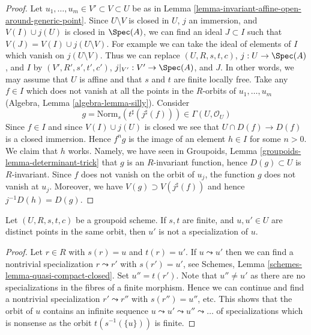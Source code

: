 \begin{proof}
Let $u_1, \ldots, u_m \in V' \subset V \subset U$ be as in
Lemma \ref{lemma-invariant-affine-open-around-generic-point}.
Since $U \setminus V$ is closed in $U$, $j$ an immersion, and $V(I) \cup j(U)$
is closed in $\Spec(A)$, we can find an ideal
$J \subset I$ such that $V(J) = V(I) \cup j(U \setminus V)$.
For example we can take the ideal of elements of $I$ which
vanish on $j(U \setminus V)$. Thus we can replace
$(U, R, s, t, c)$, $j : U \to \Spec(A)$, and $I$ by
$(V', R', s', t', c')$, $j|_{V'} : V' \to \Spec(A)$, and $J$.
In other words, we may assume that $U$ is affine and that
$s$ and $t$ are finite locally free.
Take any $f \in I$ which does not vanish at all the
points in the $R$-orbits of $u_1, \ldots, u_m$
(Algebra, Lemma \ref{algebra-lemma-silly}). Consider
$$
g = \text{Norm}_s(t^\sharp(j^\sharp(f))) \in \Gamma(U, \mathcal{O}_U)
$$
Since $f \in I$ and since $V(I) \cup j(U)$ is closed we see that
$U \cap D(f) \to D(f)$ is a closed immersion. Hence $f^ng$ is the
image of an element $h \in I$ for some $n > 0$. We claim that $h$ works.
Namely, we have seen in
Groupoids, Lemma \ref{groupoids-lemma-determinant-trick}
that $g$ is an $R$-invariant function, hence $D(g) \subset U$
is $R$-invariant. Since $f$ does not vanish on the orbit of $u_j$,
the function $g$ does not vanish at $u_j$. Moreover, we have
$V(g) \supset V(j^\sharp(f))$ and hence $j^{-1}D(h) = D(g)$.
\end{proof}

\begin{lemma}
\label{lemma-no-specializations-map-to-same-point}
Let $(U, R, s, t, c)$ be a groupoid scheme. If $s, t$ are finite,
and $u, u' \in U$ are distinct points in the same orbit,
then $u'$ is not a specialization of $u$.
\end{lemma}

\begin{proof}
Let $r \in R$ with $s(r) = u$ and $t(r) = u'$. If $u \leadsto u'$
then we can find a nontrivial specialization $r \leadsto r'$ with
$s(r') = u'$, see 
Schemes, Lemma \ref{schemes-lemma-quasi-compact-closed}.
Set $u'' = t(r')$. Note that $u'' \not = u'$ as there are no
specializations in the fibres of a finite morphism.
Hence we can continue and find a nontrivial specialization
$r' \leadsto r''$ with $s(r'') = u''$, etc. This shows that the
orbit of $u$ contains an infinite sequence
$u \leadsto u' \leadsto u'' \leadsto \ldots$
of specializations which is nonsense as the orbit
$t(s^{-1}(\{u\}))$ is finite.
\end{proof}

